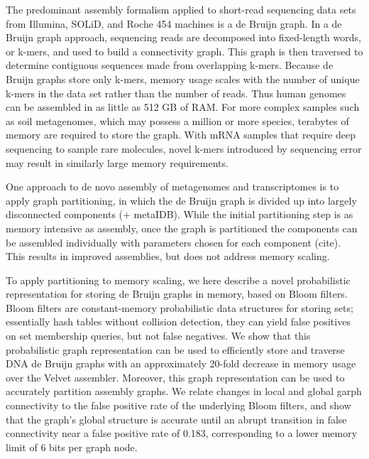\documentclass[12pt]{article} \usepackage{simplemargins}
\begin{document}
The predominant assembly formalism applied to short-read sequencing
data sets from Illumina, SOLiD, and Roche 454 machines is a de Bruijn
graph.  In a de Bruijn graph approach, sequencing reads are decomposed
into fixed-length words, or k-mers, and used to build a connectivity
graph.  This graph is then traversed to determine contiguous sequences
made from overlapping k-mers.  Because de Bruijn graphs store only
k-mers, memory usage scales with the number of unique k-mers in the
data set rather than the number of reads.  Thus human genomes can be
assembled in as little as 512 GB of RAM\cite{pmid21187386}.  For
more complex samples such as soil metagenomes, which may possess a
million or more species, terabytes of memory are required to store the
graph.  With mRNA samples that require deep sequencing to sample rare
molecules, novel k-mers introduced by sequencing error may result in
similarly large memory requirements.

One approach to de novo assembly of metagenomes and transcriptomes is
to apply graph partitioning, in which the de Bruijn graph is divided
up into largely disconnected components\cite{trinity, metavelvet} (+ metaIDB). 
While the initial partitioning step is as memory
intensive as assembly, once the graph is partitioned the components
can be assembled individually with parameters chosen for each
component (cite).  This results in improved assemblies, but does not
address memory scaling.

To apply partitioning to memory scaling, we here describe a novel
probabilistic representation for storing de Bruijn graphs in memory,
based on Bloom filters\cite{bloom}.  Bloom filters are constant-memory
probabilistic data structures for storing sets; essentially hash
tables without collision detection, they can yield false positives on
set membership queries, but not false negatives.  We show that this
probabilistic graph representation can be used to efficiently store
and traverse DNA de Bruijn graphs with an approximately 20-fold
decrease in memory usage over the Velvet assembler. Moreover, this
graph representation can be used to accurately partition assembly
graphs.  We relate changes in local and global garph connectivity
to the false positive rate of the underlying Bloom filters, and
show that the graph's global structure is accurate until an abrupt
transition in false connectivity near a false positive rate of 0.183,
corresponding to a lower memory limit of 6 bits per graph node.

\end{document}
